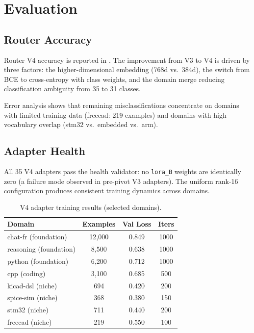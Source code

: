 \documentclass[11pt,a4paper]{article}
\begin{document}
\section{Evaluation}
\label{sec:eval}

\subsection{Router Accuracy}

Router V4 accuracy is reported in . The improvement from V3 to V4 is driven by three factors: the higher-dimensional embedding (768d vs.\ 384d), the switch from BCE to cross-entropy with class weights, and the domain merge reducing classification ambiguity from 35 to 31 classes.

Error analysis shows that remaining misclassifications concentrate on domains with limited training data (freecad: 219 examples) and domains with high vocabulary overlap (stm32 vs.\ embedded vs.\ arm).

\subsection{Adapter Health}

All 35 V4 adapters pass the health validator: no \texttt{lora\_B} weights are identically zero (a failure mode observed in pre-pivot V3 adapters). The uniform rank-16 configuration produces consistent training dynamics across domains.

\begin{table}[h]
\centering
\caption{V4 adapter training results (selected domains).}
\label{tab:adapters}
\begin{tabular}{lccc}
\toprule
\textbf{Domain} & \textbf{Examples} & \textbf{Val Loss} & \textbf{Iters} \\
\midrule
chat-fr (foundation) & 12,000 & 0.849 & 1000 \\
reasoning (foundation) & 8,500 & 0.638 & 1000 \\
python (foundation) & 6,200 & 0.712 & 1000 \\
cpp (coding) & 3,100 & 0.685 & 500 \\
kicad-dsl (niche) & 694 & 0.420 & 200 \\
spice-sim (niche) & 368 & 0.380 & 150 \\
stm32 (niche) & 711 & 0.440 & 200 \\
freecad (niche) & 219 & 0.550 & 100 \\
\bottomrule
\end{tabular}
\end{table}
\end{document}
